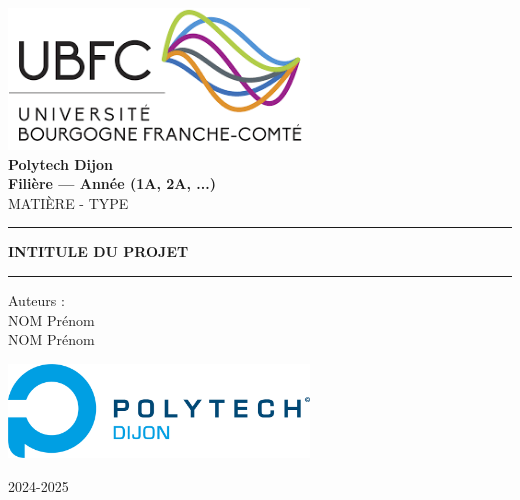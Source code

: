 \begin{center}
    
    \includegraphics[width=0.6\textwidth]{img/logo/UBFC.png}
    \Huge
    \vspace{2cm}
    \textbf{\\\vspace{0.4cm}Polytech Dijon\\ Filière — Année (1A, 2A, ...)}
    \vspace{0.75cm}
    \\MATIÈRE - TYPE

    \vspace{0.5cm}
    \color{polytech}\rule{\textwidth}{1pt}
    \begin{center}
        \vspace{0.3cm}
        \Huge
        \color{black}\textbf{INTITULE DU PROJET}   
    \end{center}
    \rule{\textwidth}{1pt}

    \vspace{0.5cm}
    \color{black}\Large 
    Auteurs :\\
    NOM Prénom\\
    NOM Prénom\\
    \vspace{0.5cm}

    \includegraphics[width=0.6\textwidth]{img/logo/Polytech_Dijon.png}
        
    \vfill
    \Large
    2024-2025
            
\end{center}
\newpage
\begingroup
    \renewcommand{\contentsname}{Sommaire}
    \tableofcontents
    \renewcommand{\listfigurename}{Table des Figures}
    \listoffigures
\endgroup
\newpage